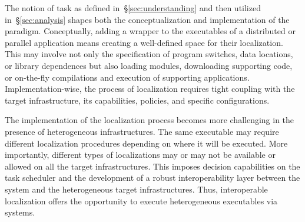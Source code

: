 \documentclass{sig-alternate}
\begin{document}
 

The notion of task as defined in~\S\ref{sec:understanding} and then utilized
in~\S\ref{sec:analysis} shapes both the conceptualization and implementation of
the \pilot paradigm. Conceptually, adding a wrapper to the executables of a
distributed or parallel application means creating a well-defined space for
their localization. This may involve not only the specification of program
switches, data locations, or library dependences but also loading modules,
downloading supporting code, or on-the-fly compilations and execution of
supporting applications. Implementation-wise, the process of localization
requires tight coupling with the target infrastructure, its capabilities,
policies, and specific configurations.

The implementation of the localization process becomes more challenging in the
presence of heterogeneous infrastructures. The same executable may require
different localization procedures depending on where it will be executed. More
importantly, different types of localizations may or may not be available or
allowed on all the target infrastructures. This imposes decision capabilities on
the task scheduler and the development of a robust interoperability layer
between the \pilot system and the heterogeneous target infrastructures.  Thus,
interoperable localization offers the opportunity to execute heterogeneous
executables via \pilot systems.


\end{document}
